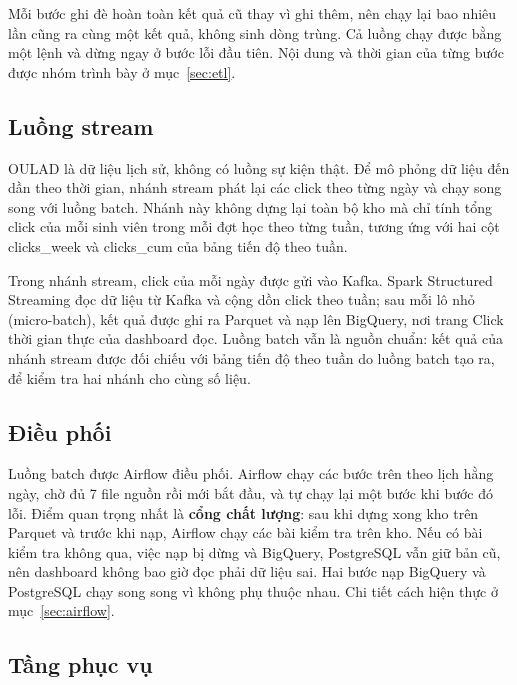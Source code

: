Mỗi bước ghi đè hoàn toàn kết quả cũ thay vì ghi thêm, nên chạy lại bao nhiêu lần cũng ra
cùng một kết quả, không sinh dòng trùng. Cả luồng chạy được bằng một lệnh và dừng ngay ở
bước lỗi đầu tiên. Nội dung và thời gian của từng bước được nhóm trình bày ở mục~\ref{sec:etl}.

\subsection{Luồng stream}
\label{sec:kien-truc-stream}

OULAD là dữ liệu lịch sử, không có luồng sự kiện thật. Để mô phỏng dữ liệu đến dần theo thời gian, nhánh stream phát lại các click theo từng ngày và chạy song song với luồng batch. Nhánh này không dựng lại toàn bộ kho mà chỉ tính tổng click của mỗi sinh viên trong mỗi đợt học theo từng tuần, tương ứng với hai cột clicks\_week và clicks\_cum của bảng tiến độ theo tuần.

Trong nhánh stream, click của mỗi ngày được gửi vào Kafka. Spark Structured Streaming đọc dữ liệu từ Kafka và cộng dồn click theo tuần; sau mỗi lô nhỏ (micro-batch), kết quả được ghi ra Parquet và nạp lên BigQuery, nơi trang Click thời gian thực của dashboard đọc. Luồng batch vẫn là nguồn chuẩn: kết quả của nhánh stream được đối chiếu với bảng tiến độ theo tuần do luồng batch tạo ra, để kiểm tra hai nhánh cho cùng số liệu.

\subsection{Điều phối}
\label{sec:dieu-phoi}

Luồng batch được Airflow điều phối. Airflow chạy các bước trên theo lịch hằng ngày, chờ đủ
7 file nguồn rồi mới bắt đầu, và tự chạy lại một bước khi bước đó lỗi. Điểm quan trọng nhất
là \textbf{cổng chất lượng}: sau khi dựng xong kho trên Parquet và trước khi nạp, Airflow
chạy các bài kiểm tra trên kho. Nếu có bài kiểm tra không qua, việc nạp bị dừng và
BigQuery, PostgreSQL vẫn giữ bản cũ, nên dashboard không bao giờ đọc phải dữ liệu sai. Hai
bước nạp BigQuery và PostgreSQL chạy song song vì không phụ thuộc nhau. Chi tiết cách hiện
thực ở mục~\ref{sec:airflow}.

\subsection{Tầng phục vụ}
\label{sec:tang-phuc-vu}

